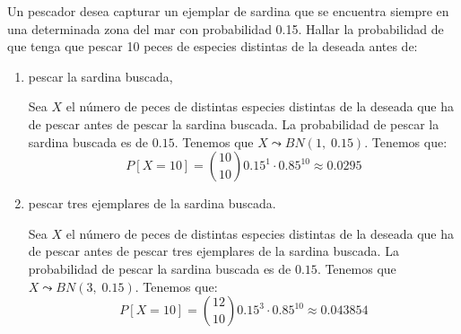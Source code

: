 \begin{ejercicio}
     Un pescador desea capturar un ejemplar de sardina que se encuentra siempre en una determinada zona del mar con probabilidad 0.15. Hallar la probabilidad de que tenga que pescar 10 peces de especies distintas de la deseada antes de:
     \begin{enumerate}
         \item pescar la sardina buscada,

         Sea $X$ el número de peces de distintas especies distintas de la deseada que ha de pescar antes de pescar la sardina buscada. La probabilidad de pescar la sardina buscada es de $0.15$. Tenemos que $X\leadsto BN(1,\;0.15)$. Tenemos que:
         \begin{equation*}
            P[X=10]=\binom{10}{10}0.15^1 \cdot 0.85^{10}\approx 0.0295
         \end{equation*}
         
         \item pescar tres ejemplares de la sardina buscada.

         Sea $X$ el número de peces de distintas especies distintas de la deseada que ha de pescar antes de pescar tres ejemplares de la sardina buscada. La probabilidad de pescar la sardina buscada es de $0.15$. Tenemos que $X\leadsto BN(3,\;0.15)$. Tenemos que:
         \begin{equation*}
            P[X=10]=\binom{12}{10}0.15^3 \cdot 0.85^{10}\approx 0.043854
         \end{equation*}
     \end{enumerate}
\end{ejercicio}


